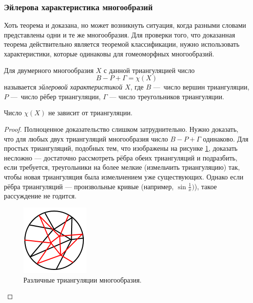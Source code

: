 \subsubsection{Эйлерова характеристика многообразий}

\begin{remark}
    Хоть теорема и доказана, но может возникнуть ситуация, когда разными словами представлены одни и те же многообразия. Для проверки того, что доказанная теорема действительно является теоремой классификации, нужно использовать характеристики, которые одинаковы для гомеоморфных многообразий.
\end{remark}

\begin{definition}
    Для двумерного многообразия $X$ с данной триангуляцией число
    \[B - P + \Gamma = \chi(X)\]
    называется \textit{эйлеровой характеристикой $X$}, где $B$ — число вершин триангуляции, $P$ — число рёбер триангуляции, $\Gamma$ — число треугольников триангуляции.
\end{definition} 

\begin{theorem}
    Число $\chi(X)$ не зависит от триангуляции.
\end{theorem} 
\begin{proof}
    Полноценное доказательство слишком затруднительно. Нужно доказать, что для любых двух триангуляций многообразия число $B - P + \Gamma$ одинаково. Для простых триангуляций, подобных тем, что изображены на рисунке \ref{fig:c11.1}, доказать несложно — достаточно рассмотреть рёбра обеих триангуляций и подразбить, если требуется, треугольники на более мелкие (измельчить триангуляцию) так, чтобы новая триангуляция была измельчением уже существующих. Однако если рёбра триангуляций — произвольные кривые (например, $\sin{\frac{1}x})$), такое рассуждение не годится.

    \begin{figure}[ht]
        \centering
        \includegraphics[scale=0.7]{images/c11.1.png}
        \caption{Различные триангуляции многообразия.}
        \label{fig:c11.1}
    \end{figure}
\end{proof} 


